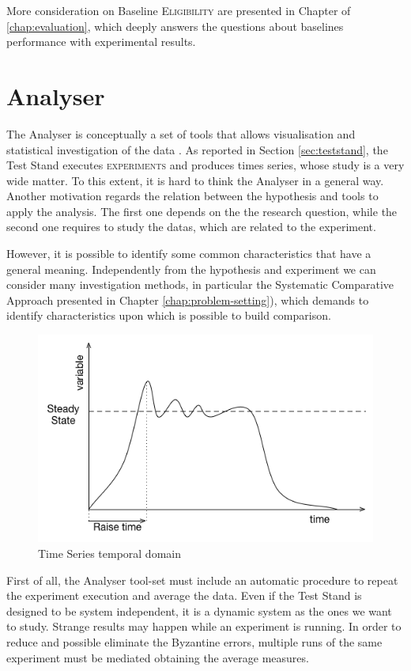 More consideration on Baseline \textsc{Eligibility} are presented in Chapter of \ref{chap:evaluation}, which deeply answers the questions about baselines performance with experimental results. 

\section{Analyser}\label{sec:analyser}

The Analyser is conceptually a set of tools that allows visualisation and statistical investigation of the data . As reported in Section \ref{sec:teststand}, the Test Stand executes \textsc{experiments} and produces times series, whose study is a very wide matter. To this extent, it is hard to think the Analyser in a general way. Another motivation regards the relation between the hypothesis and    tools to apply the analysis. The first one depends on the the research question, while the second one requires to study the datas, which are related to the experiment. 

However, it is possible to identify some common characteristics that have a general meaning. Independently from the hypothesis and  experiment we can consider many investigation methods, in particular the Systematic Comparative Approach presented in Chapter \ref{chap:problem-setting}), which demands to identify characteristics upon which is possible to build comparison. 

\begin{figure}[tbh]
  \centering
	\includegraphics[width=0.5\linewidth]{images/steady-state}
	\caption{Time Series temporal domain} 	
  	\label{fig:steady-state}
\end{figure}

First of all, the Analyser tool-set must include an automatic procedure to repeat the experiment execution and average the data. Even if the Test Stand is designed to be system independent, it is a dynamic system as the ones we want to study. Strange results may happen while an experiment is running. In order to reduce and possible eliminate the Byzantine errors, multiple runs of the same experiment must be mediated obtaining the average measures. 

